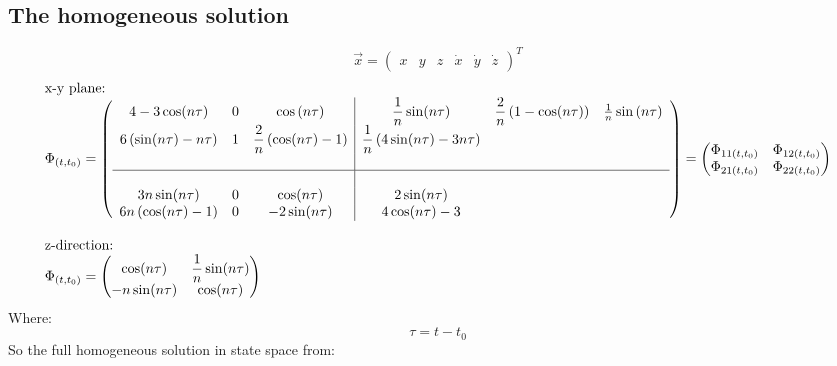 \documentclass[11pt, a4paper]{article}
\begin{document}
\subsection{The homogeneous solution}
\begin{equation}
    \vec{x} = \begin{pmatrix}
        x & y & z & \dot{x} & \dot{y} & \dot{z}
    \end{pmatrix}^T
\end{equation}
\begin{equation}
    \begin{array}{l}
        \text{x-y plane:} \\
        \Phi_{(t,t_0)} = \left(\begin{array}{ccc|ccc}
            4-3\cos(n\tau) & 0 & \cos\left(n\tau\right) &\displaystyle \frac{1}{n}\sin(n\tau) &\displaystyle \frac{2}{n}\left(1-\cos(n\tau)\right) & \frac{1}{n}\sin\left(n\tau\right) \\ 
            6\left(\sin(n\tau)-n\tau\right) & 1 &\displaystyle \frac{2}{n}\left(\cos(n\tau)-1\right) &\displaystyle \frac{1}{n}\left(4\sin(n\tau)-3n\tau\right)\\ &&& \\ \hline &&& \\
            3n\sin(n\tau) & 0 & \cos(n\tau) & 2\sin(n\tau) \\
            6n\left(\cos(n\tau)-1\right) & 0 & -2\sin(n\tau) & 4\cos(n\tau)-3 
        \end{array}\right) = \begin{pmatrix}
            \Phi_{11(t,t_0)} & \Phi_{12(t,t_0)} \\
            \Phi_{21(t,t_0)} & \Phi_{22(t,t_0)}
        \end{pmatrix} \\ \\ 
    \text{z-direction:} \\
    \Phi_{(t,t_0)} = \begin{pmatrix}
        \cos(n\tau) & \displaystyle\frac{1}{n}\sin(n\tau) \\
        -n\sin(n\tau) & \cos(n\tau)
    \end{pmatrix}
    \end{array}
\end{equation}
Where:
\begin{equation*}
    \tau = t-t_0
\end{equation*}
So the full homogeneous solution in state space from:
\end{document}
